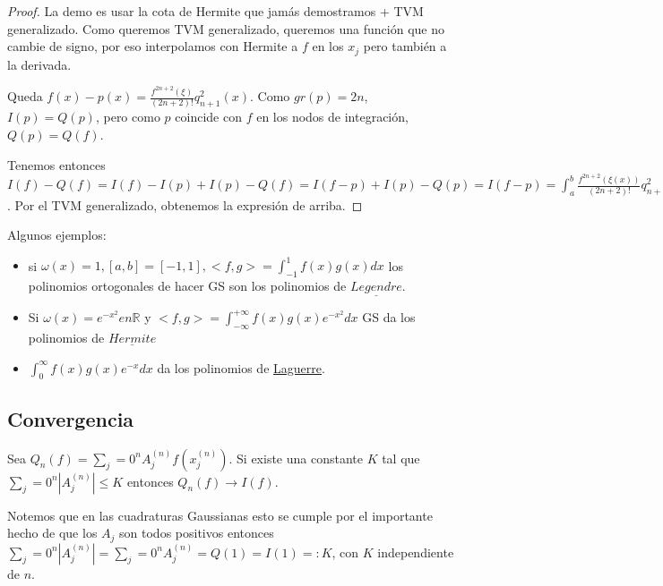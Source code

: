 \documentclass[10pt,a4paper,final]{report}
\begin{document}
\begin{proof}
	La demo es usar la cota de Hermite que jamás demostramos + TVM generalizado. Como queremos TVM generalizado, queremos una función que no cambie de signo, por eso interpolamos con Hermite a $f$ en los $x_j$ pero también a la derivada.
	
	Queda $f(x) - p(x) = \frac{f^{2n+2}(\xi)}{(2n+2)!} q_{n+1}^2(x)$. Como $gr(p) = 2n$, $I(p) = Q(p)$, pero como $p$ coincide con $f$ en los nodos de integración, $Q(p)=Q(f)$.
	
	Tenemos entonces $I(f)-Q(f) = I(f) - I(p) + I(p) - Q(f) = I(f-p) + I(p) - Q(p) = I(f-p) = \int_a^b  \frac{f^{2n+2}(\xi(x))}{(2n+2)!} q_{n+1}^2(x) dx$. Por el TVM generalizado, obtenemos la expresión de arriba.
\end{proof}

\begin{example}
Algunos ejemplos:

\begin{itemize}
	\item si $\omega(x) = 1, [a,b]= [-1,1], <f,g> = \int_{-1}^1 f(x)g(x) dx$ los polinomios ortogonales de hacer GS son los polinomios de $\underline{Legendre}$.
	\item Si $\omega(x) = e^{-x^2} en \mathbb{R}$ y $<f,g> = \int_{-\infty}^{+\infty} f(x) g(x) e^{-x^2} dx$ GS da los polinomios de $\underline{Hermite}$
	\item $\int_0^\infty f(x) g(x) e^{-x} dx$ da los polinomios de \underline{Laguerre}.
\end{itemize}
\end{example}

\subsection{Convergencia}
\begin{theorem}
	Sea $Q_n(f) = \sum_j=0^n A_j^{(n)} f(x_j^{(n)})$. Si existe una constante $K$ tal que $\sum_j=0^n |A_j^{(n)}|\leq K$ entonces $Q_n(f) \to I(f)$.
\end{theorem}

\begin{corollary}
	Notemos que en las cuadraturas Gaussianas esto se cumple por el importante hecho de que los $A_j$ son todos positivos entonces $\sum_j=0^n |A_j^{(n)}| = \sum_j=0^n A_j^{(n)} = Q(1) = I(1) =: K$, con $K$ independiente de $n$.
\end{corollary}
\end{document}
